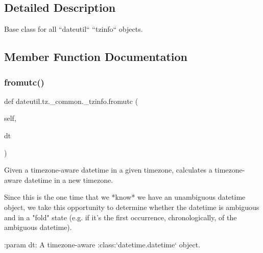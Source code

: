 \subsection{Detailed Description}
\begin{DoxyVerb}Base class for all ``dateutil`` ``tzinfo`` objects.
\end{DoxyVerb}
 

\subsection{Member Function Documentation}
\mbox{\label{classdateutil_1_1tz_1_1__common_1_1__tzinfo_ab3260efb99632430daa43df1b481e8e7}} 
\subsubsection{\texorpdfstring{fromutc()}{fromutc()}}
{\footnotesize\ttfamily def dateutil.\+tz.\+\_\+common.\+\_\+tzinfo.\+fromutc (\begin{DoxyParamCaption}\item[{}]{self,  }\item[{}]{dt }\end{DoxyParamCaption})}

\begin{DoxyVerb}Given a timezone-aware datetime in a given timezone, calculates a
timezone-aware datetime in a new timezone.

Since this is the one time that we *know* we have an unambiguous
datetime object, we take this opportunity to determine whether the
datetime is ambiguous and in a "fold" state (e.g. if it's the first
occurrence, chronologically, of the ambiguous datetime).

:param dt:
    A timezone-aware :class:`datetime.datetime` object.
\end{DoxyVerb}
 \mbox{\label{classdateutil_1_1tz_1_1__common_1_1__tzinfo_a13210a0c147bb97440e89babe38ac60c}} 
